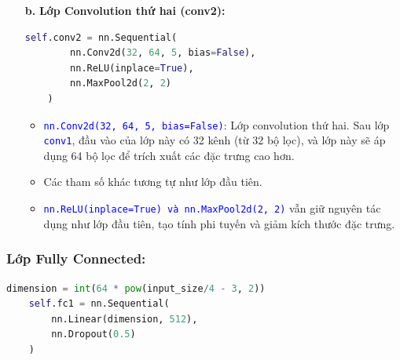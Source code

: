 \begin{enumerate}
\item[\textbf{b.}] \textbf{Lớp Convolution thứ hai (conv2):}

\begin{lstlisting}[language=python]
    self.conv2 = nn.Sequential(
        nn.Conv2d(32, 64, 5, bias=False),
        nn.ReLU(inplace=True),
        nn.MaxPool2d(2, 2)
    )
\end{lstlisting}

    \begin{itemize}
        \item \textcolor{blue}{\texttt{nn.Conv2d(32, 64, 5, bias=False)}}: Lớp convolution thứ hai. Sau lớp \textcolor{blue}{\texttt{conv1}}, đầu vào của lớp này có 32 kênh (từ 32 bộ lọc), và lớp này sẽ áp dụng 64 bộ lọc để trích xuất các đặc trưng cao hơn.
        
        \item Các tham số khác tương tự như lớp đầu tiên.

        \item \textcolor{blue}{\texttt{nn.ReLU(inplace=True) và nn.MaxPool2d(2, 2)}} vẫn giữ nguyên tác dụng như lớp đầu tiên, tạo tính phi tuyến và giảm kích thước đặc trưng.
    \end{itemize}
\end{enumerate}
\subsubsection{Lớp Fully Connected:}

\begin{lstlisting}[language=python]
    dimension = int(64 * pow(input_size/4 - 3, 2))
    self.fc1 = nn.Sequential(
        nn.Linear(dimension, 512),
        nn.Dropout(0.5)
    )
\end{lstlisting}

